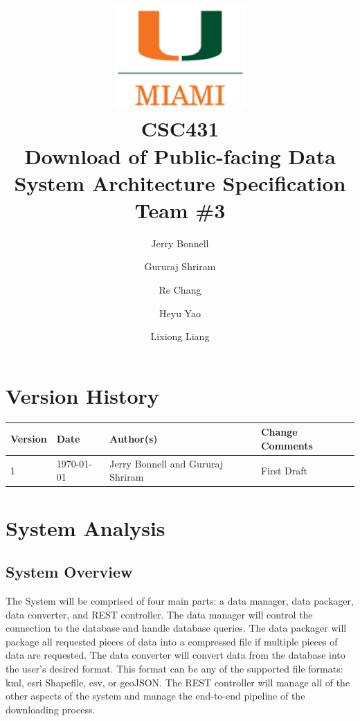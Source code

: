 \documentclass{article}
\begin{document}
\title{
	\includegraphics{images/um_logo.png} \\
	\vspace{0.1in}
	CSC431 \\
	\vspace{0.2in}
	\textbf{Download of Public-facing Data} \\
	\large System Architecture Specification \\
	Team \#3
}

\author{
	Jerry Bonnell
	\and Gururaj Shriram
	\and Re Chang
	\and Heyu Yao
	\and Lixiong Liang
}

\date{}
\maketitle

\clearpage
\section*{Version History}

\begin{tabularx}{\textwidth}{| l | l | X | l |}
	\hline
	\textbf{Version} & \textbf{Date} & \textbf{Author(s)} & \textbf{Change Comments} \\
	\hline
	1 & \today & Jerry Bonnell and Gururaj Shriram & First Draft \\
	\hline
\end{tabularx}

\clearpage
\tableofcontents

\clearpage
\listoffigures
\listoftables

\clearpage

\section{System Analysis}

\subsection{System Overview}

The System will be comprised of four main parts: a data manager, data packager, data converter, and REST controller. The data manager will control the connection to the database and handle database queries. The data packager will package all requested pieces of data into a compressed file if multiple pieces of data are requested. The data converter will convert data from the database into the user's desired format. This format can be any of the supported file formats: kml, esri Shapefile, csv, or geoJSON. The REST controller will manage all of the other aspects of the system and manage the end-to-end pipeline of the downloading process. \\
\end{document}
